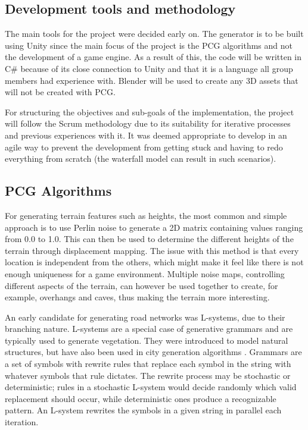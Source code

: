 \subsection{Development tools and methodology}

The main tools for the project were decided early on. The generator is to be built using Unity since the main focus of the project is the PCG algorithms and not the development of a game engine. As a result of this, the code will be written in C\# because of its close connection to Unity and that it is a language all group members had experience with. Blender will be used to create any 3D assets that will not be created with PCG.

For structuring the objectives and sub-goals of the implementation, the project will follow the Scrum methodology due to its suitability for iterative processes and previous experiences with it. It was deemed appropriate to develop in an agile way to prevent the development from getting stuck and having to redo everything from scratch (the waterfall model can result in such scenarios).

\subsection{PCG Algorithms}
For generating terrain features such as heights, the most common and simple approach is to use Perlin noise to generate a 2D matrix containing values ranging from 0.0 to 1.0. This can then be used to determine the different heights of the terrain through displacement mapping. The issue with this method is that every location is independent from the others, which might make it feel like there is not enough uniqueness for a game environment. Multiple noise maps, controlling different aspects of the terrain, can however be used together to create, for example, overhangs and caves, thus making the terrain more interesting.

An early candidate for generating road networks was L-systems, due to their branching nature. L-systems are a special case of generative grammars and are typically used to generate vegetation. They were introduced to model natural structures, but have also been used in city generation algorithms \cite{yoav-pascal}. Grammars are a set of symbols with rewrite rules that replace each symbol in the string with whatever symbols that rule dictates. The rewrite process may be stochastic or deterministic; rules in a stochastic L-system would decide randomly which valid replacement should occur, while deterministic ones produce a recognizable pattern. An L-system rewrites the symbols in a given string in parallel each iteration. 

